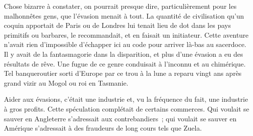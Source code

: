 \documentclass[french,twoside]{book} %
\begin{document}
Chose bizarre à constater, on pourrait presque dire, particulièrement pour les malhonnêtes gens, que l’évasion menait à tout. La quantité de civilisation qu’un coquin apportait de Paris ou de Londres lui tenait lieu de dot dans les pays primitifs ou barbares, le recommandait, et en faisait un initiateur. Cette aventure n’avait rien d’impossible d’échapper ici au code pour arriver là-bas au sacerdoce. Il y avait de la fantasmagorie dans la disparition, et plus d’une évasion a eu des résultats de rêve. Une fugue de ce genre conduisait à l’inconnu et au chimérique. Tel banqueroutier sorti d’Europe par ce trou à la lune a reparu vingt ans après grand vizir au Mogol ou roi en Tasmanie.\par
Aider aux évasions, c’était une industrie et, vu la fréquence du fait, une industrie à gros profits. Cette  spéculation complétait de certains commerces. Qui voulait se sauver en Angleterre s’adressait aux contrebandiers ; qui voulait se sauver en Amérique s’adressait à des fraudeurs de long cours tels que Zuela.
\end{document}
